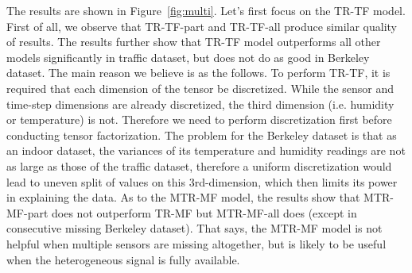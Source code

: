 The results are shown in Figure~\ref{fig:multi}. Let's first focus on the TR-TF model. First of all, we observe that TR-TF-part and TR-TF-all produce similar quality of results. The results further show that TR-TF model outperforms all other models significantly in traffic dataset, but does not do as good in Berkeley dataset. The main reason we believe is as the follows. To perform TR-TF, it is required that each dimension of the tensor be discretized. While the sensor and time-step dimensions are already discretized, the third dimension (i.e. humidity or temperature) is not. Therefore we need to perform discretization first before conducting tensor factorization. The problem for the Berkeley dataset is that as an indoor dataset, the variances of its temperature and humidity readings are not as large as those of the traffic dataset, therefore a uniform discretization would lead to uneven split of values on this 3rd-dimension, which then limits its power in explaining the data.  
As to the MTR-MF model, the results show that MTR-MF-part does not outperform TR-MF but MTR-MF-all does (except in consecutive missing Berkeley dataset). That says, the MTR-MF model is not helpful when multiple sensors are missing altogether, but is likely to be useful when the heterogeneous signal is fully available. 

